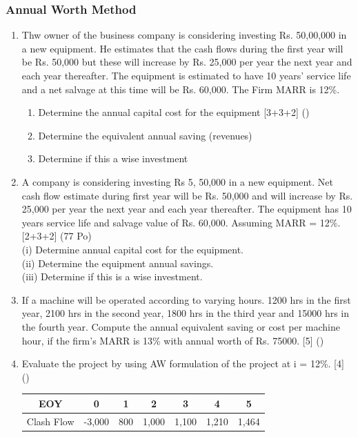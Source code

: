 \documentclass[12pt]{article}
\begin{document}
		\subsubsection{Annual Worth Method}
			\begin{enumerate}[noitemsep, topsep = 0pt]
				\item Thw owner of the business company is considering investing Rs. 50,00,000 in a new equipment. He estimates that the cash flows during the first year will be Rs. 50,000 but these will increase by Rs. 25,000 per year the next year and each year thereafter. The equipment is estimated to have 10 years' service life and a net salvage at this time will be Rs. 60,000. The Firm MARR is 12\%.
				\begin{enumerate}[noitemsep, topsep = 0pt, label = \alph*]
					\item Determine the annual capital cost for the equipment \hfill [3+3+2] ()
					\item Determine the equivalent annual saving (revenues)
					\item Determine if this a wise investment
				\end{enumerate}
				
				\item A company is considering investing Rs 5, 50,000 in a new equipment. Net cash flow estimate during first year will be Rs. 50,000 and will increase by Rs. 25,000 per year the next year and each year thereafter. The equipment has 10 years service life and salvage value of Rs. 60,000. Assuming MARR = 12\%.\hfill[2+3+2] (77 Po)\\
			    (i) Determine annual capital cost for the equipment.\\
			    (ii) Determine the equipment annual savings.\\
			    (iii) Determine if this is a wise investment.
				
				\item If a machine will be operated according to varying hours. 1200 hrs in the first year, 2100 hrs in the second year, 1800 hrs in the third year and 15000 hrs in the fourth year. Compute the annual equivalent saving or cost per machine hour, if the firm's MARR is 13\% with annual worth of Rs. 75000. \hfill [5] ()
				
				\item Evaluate the project by using AW formulation of the project at i = 12\%. \hfill [4] ()\\
				\begin{tabular}{|c|c|c|c|c|c|c|}
					\hline
					EOY & 0 & 1 & 2 & 3 & 4 & 5\\ \hline
					Clash Flow & -3,000 & 800 & 1,000 & 1,100 & 1,210 & 1,464\\ \hline
				\end{tabular}\\[0pt]
			\end{enumerate}
\end{document}

